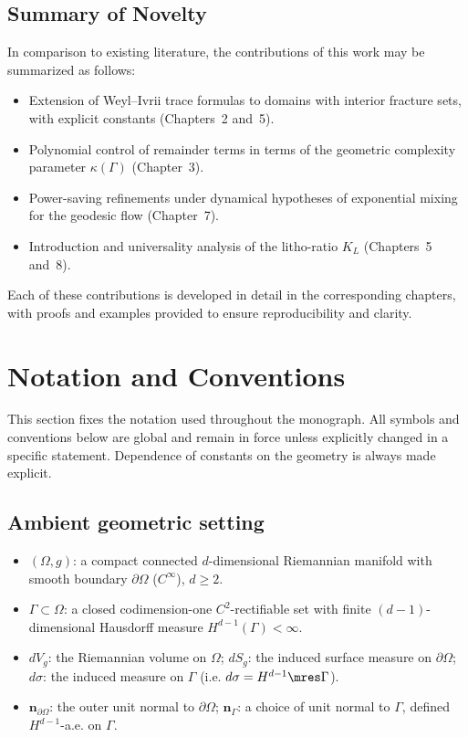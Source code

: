 \subsection{Summary of Novelty}
In comparison to existing literature, the contributions of this work may be
summarized as follows:
\begin{itemize}
  \item Extension of Weyl--Ivrii trace formulas to domains with interior fracture
  sets, with explicit constants (Chapters~2 and~5).
  \item Polynomial control of remainder terms in terms of the geometric
  complexity parameter $\kappa(\Gamma)$ (Chapter~3).
  \item Power-saving refinements under dynamical hypotheses of exponential
  mixing for the geodesic flow (Chapter~7).
  \item Introduction and universality analysis of the litho-ratio $K_L$
  (Chapters~5 and~8).
\end{itemize}
Each of these contributions is developed in detail in the corresponding
chapters, with proofs and examples provided to ensure reproducibility and
clarity.


\section{Notation and Conventions}
\label{sec:notation}

This section fixes the notation used throughout the monograph. All symbols and
conventions below are global and remain in force unless explicitly changed in a
specific statement. Dependence of constants on the geometry is always made explicit.

\subsection{Ambient geometric setting}

\begin{itemize}
  \item $(\Omega,g)$: a compact connected $d$-dimensional Riemannian manifold
  with smooth boundary $\partial\Omega$ ($C^\infty$), $d\ge 2$.
  \item $\Gamma\subset \Omega$: a closed codimension-one $C^2$-rectifiable set
  with finite $(d-1)$-dimensional Hausdorff measure $H^{d-1}(\Gamma)<\infty$.
  \item $dV_g$: the Riemannian volume on $\Omega$; $dS_g$: the induced surface
  measure on $\partial\Omega$; $d\sigma$: the induced measure on $\Gamma$
  (i.e. $d\sigma=H^{d-1}\mres\Gamma$).
  \item $\mathbf{n}_{\partial\Omega}$: the outer unit normal to $\partial\Omega$;
  $\mathbf{n}_\Gamma$: a choice of unit normal to $\Gamma$, defined
  $H^{d-1}$-a.e. on $\Gamma$.
\end{itemize}


